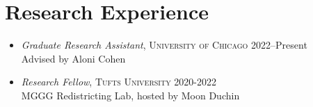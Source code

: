 \section*{Research Experience}
\begin{itemize}

\item\emph{Graduate Research Assistant},
\textsc{University of Chicago} \hfill 2022--Present\\
Advised by Aloni Cohen

\item\emph{Research Fellow},
\textsc{Tufts University} \hfill 2020-2022\\
MGGG Redistricting Lab, hosted by Moon Duchin

\end{itemize}

